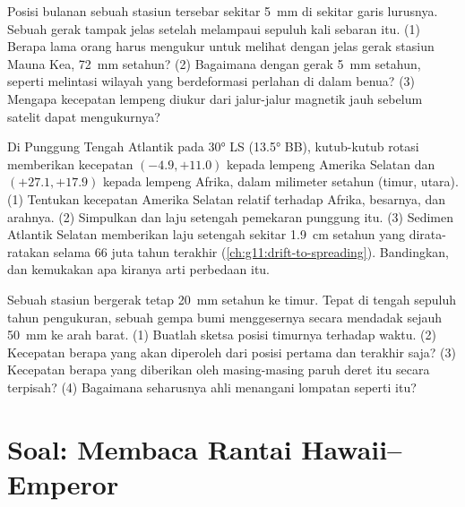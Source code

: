 \begin{exercise}[$\star\star\star$]\label{exo:g11:plate-motions:13}
Posisi bulanan sebuah stasiun tersebar sekitar \qty{5}{mm} di sekitar garis
lurusnya. Sebuah gerak tampak jelas setelah melampaui sepuluh kali sebaran itu.
(1) Berapa lama orang harus mengukur untuk melihat dengan jelas gerak stasiun
Mauna Kea, \qty{72}{mm} setahun? (2) Bagaimana dengan gerak \qty{5}{mm}
setahun, seperti melintasi wilayah yang berdeformasi perlahan di dalam benua?
(3) Mengapa kecepatan lempeng diukur dari jalur-jalur magnetik jauh sebelum
satelit dapat mengukurnya?
\end{exercise}

\begin{exercise}[$\star\star\star$]\label{exo:g11:plate-motions:14}
Di Punggung Tengah Atlantik pada \ang{30} LS (\ang{13.5} BB), kutub-kutub
rotasi memberikan kecepatan $(-4.9, +11.0)$ kepada lempeng Amerika Selatan dan
$(+27.1, +17.9)$ kepada lempeng Afrika, dalam milimeter setahun (timur, utara).
(1) Tentukan kecepatan Amerika Selatan relatif terhadap Afrika, besarnya, dan
arahnya. (2) Simpulkan  dan laju setengah pemekaran
punggung itu. (3) Sedimen Atlantik Selatan memberikan laju setengah sekitar
\qty{1.9}{cm} setahun yang dirata-ratakan selama 66 juta tahun terakhir
(\cref{ch:g11:drift-to-spreading}). Bandingkan, dan kemukakan apa kiranya arti
perbedaan itu.
\end{exercise}

\begin{exercise}[$\star\star\star$]\label{exo:g11:plate-motions:15}
Sebuah stasiun bergerak tetap \qty{20}{mm} setahun ke timur. Tepat di tengah
sepuluh tahun pengukuran, sebuah gempa bumi menggesernya secara mendadak sejauh
\qty{50}{mm} ke arah barat. (1) Buatlah sketsa posisi timurnya terhadap waktu.
(2) Kecepatan berapa yang akan diperoleh dari posisi pertama dan terakhir saja?
(3) Kecepatan berapa yang diberikan oleh masing-masing paruh deret itu secara
terpisah? (4) Bagaimana seharusnya ahli  menangani lompatan seperti itu?
\end{exercise}

\section{Soal: Membaca Rantai Hawaii--Emperor}

